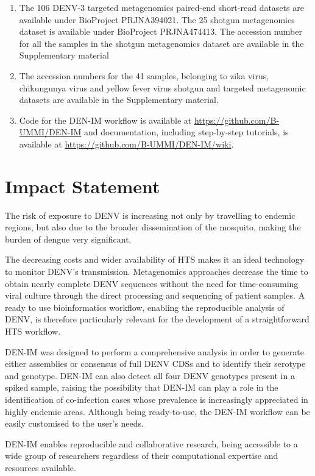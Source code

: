 \begin{enumerate}
    \item The 106 DENV-3 targeted metagenomics paired-end short-read datasets are available under BioProject PRJNA394021. The 25 shotgun metagenomics dataset is available under BioProject PRJNA474413. The accession number for all the samples in the shotgun metagenomics dataset are available in the Supplementary material
    \item The accession numbers for the 41 samples, belonging to zika virus, chikungunya virus and yellow fever virus shotgun and targeted metagenomic datasets are available in the Supplementary material. 
    \item Code for the DEN-IM workflow is available at \url{https://github.com/B-UMMI/DEN-IM} and documentation, including step-by-step tutorials, is available at \url{https://github.com/B-UMMI/DEN-IM/wiki}.
\end{enumerate}

\section{Impact Statement}
The risk of exposure to DENV is increasing not only by travelling to endemic regions, but also due to the broader dissemination of the mosquito, making the burden of dengue very significant.

The decreasing costs and wider availability of HTS makes it an ideal technology to monitor DENV’s transmission. Metagenomics approaches decrease the time to obtain nearly complete DENV sequences without the need for time-consuming viral culture through the direct processing and sequencing of patient samples. A ready to use bioinformatics workflow, enabling the reproducible analysis of DENV, is therefore particularly relevant for the development of a straightforward HTS workflow.

DEN-IM was designed to perform a comprehensive analysis in order to generate either assemblies or consensus of full DENV CDSs and to identify their serotype and genotype. DEN-IM can also detect all four DENV genotypes present in a spiked sample, raising the possibility that DEN-IM can play a role in the identification of co-infection cases whose prevalence is increasingly appreciated in highly endemic areas. Although being ready-to-use, the DEN-IM workflow can be easily customised to the user’s needs.

DEN-IM enables reproducible and collaborative research, being accessible to a wide group of researchers regardless of their computational expertise and resources available.

